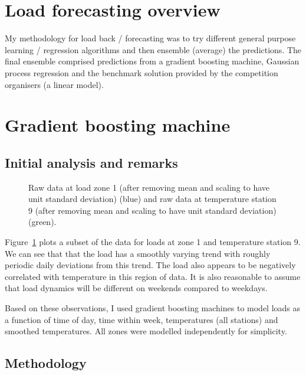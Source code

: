\documentclass[preprint,authoryear,12pt]{elsarticle}
\begin{document}
\section{Load forecasting overview}

My methodology for load back / forecasting was to try different general purpose learning / regression algorithms and then ensemble (average) the predictions.
The final ensemble comprised predictions from a gradient boosting machine, Gaussian process regression and the benchmark solution provided by the competition organisers (a linear model).

\section{Gradient boosting machine}

\subsection{Initial analysis and remarks}

\label{sec:gbm_init_anal}

\begin{figure}[ht]
  \begin{center}
    
  \end{center}
  \caption{Raw data at load zone 1 (after removing mean and scaling to have unit standard deviation) (blue) and raw data at temperature station 9 (after removing mean and scaling to have unit standard deviation) (green).}
  \label{fig:load_temp}
\end{figure}

Figure~\ref{fig:load_temp} plots a subset of the data for loads at zone 1 and temperature station 9.
We can see that that the load has a smoothly varying trend with roughly periodic daily deviations from this trend.
The load also appears to be negatively correlated with temperature in this region of data.
It is also reasonable to assume that load dynamics will be different on weekends compared to weekdays.

Based on these observations, I used gradient boosting machines to model loads as a function of time of day, time within week, temperatures (all stations) and smoothed temperatures.
All zones were modelled independently for simplicity.

\subsection{Methodology}
\end{document}
